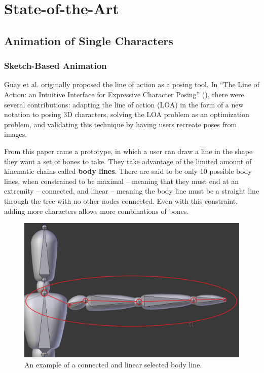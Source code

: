 \chapter{State-of-the-Art}\label{chap:sota}
\section{Animation of Single Characters}
\subsection{Sketch-Based Animation}
Guay et al. originally proposed the line of action as a posing tool. In ``The Line of Action: an Intuitive Interface for Expressive Character Posing'' (\citep{guay2013line}), there were several contributions: adapting the line of action (LOA) in the form of a new notation to posing 3D characters, solving the LOA problem as an optimization problem, and validating this technique by having users recreate poses from images. 

From this paper came a prototype, in which a user can draw a line in the shape they want a set of bones to take. They take advantage of the limited amount of kinematic chains called \textbf{body lines}. There are said to be only 10 possible body lines, when constrained to be maximal -- meaning that they must end at an extremity -- connected, and linear -- meaning the body line must be a straight line through the tree with no other nodes connected. Even with this constraint, adding more characters allows more combinations of bones.

\begin{figure}[!h]
\centering
\includegraphics[scale=0.4]{img/shoulder}
\caption{An example of a connected and linear selected body line.}
\end{figure}

